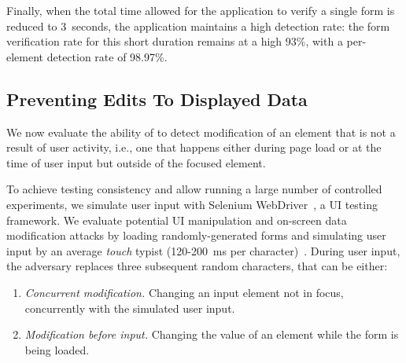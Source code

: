 Finally, when the total time allowed for the application to verify a single form is reduced to 3~seconds, the application maintains a high detection rate: the form verification rate for this short duration remains at a high 93\%, with a per-element detection rate of 98.97\%.




\subsection{Preventing Edits To Displayed Data} \label{ssec:inputSupervisionEvaluation}

We now evaluate the ability of \sysname to detect modification of an element that is not a result of user activity, i.e., one that happens either during page load or at the time of user input but outside of the focused element.

To achieve testing consistency and allow running a large number of controlled experiments, we simulate user input with Selenium WebDriver~\cite{seleniumWebDriver}, a UI testing framework.
We evaluate potential UI manipulation and on-screen data modification attacks by loading randomly-generated forms and simulating user input by an average \textit{touch} typist (120-200~ms per character)~\cite{pereira2013effect}.
During user input, the adversary replaces three subsequent random characters, that can be either:
\begin{enumerate}
	\item \emph{Concurrent modification.} Changing an input element not in focus, concurrently with the simulated user input.
    \item \emph{Modification before input.} Changing the value of an element while the form is being loaded.
\end{enumerate}
